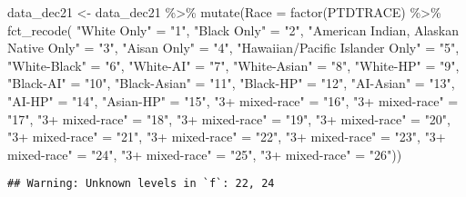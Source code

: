 \documentclass[
]{article}
\newenvironment{Shaded}{\begin{snugshade}}{\end{snugshade}}
\newcommand{\AttributeTok}[1]{\textcolor[rgb]{0.77,0.63,0.00}{#1}}
\newcommand{\FunctionTok}[1]{\textcolor[rgb]{0.00,0.00,0.00}{#1}}
\newcommand{\NormalTok}[1]{#1}
\newcommand{\OtherTok}[1]{\textcolor[rgb]{0.56,0.35,0.01}{#1}}
\newcommand{\SpecialCharTok}[1]{\textcolor[rgb]{0.00,0.00,0.00}{#1}}
\newcommand{\StringTok}[1]{\textcolor[rgb]{0.31,0.60,0.02}{#1}}
\begin{document}
\begin{Shaded}
\begin{Highlighting}[]
\NormalTok{data\_dec21 }\OtherTok{\textless{}{-}}\NormalTok{ data\_dec21 }\SpecialCharTok{\%\textgreater{}\%} 
  \FunctionTok{mutate}\NormalTok{(}\AttributeTok{Race =} \FunctionTok{factor}\NormalTok{(PTDTRACE) }\SpecialCharTok{\%\textgreater{}\%} 
    \FunctionTok{fct\_recode}\NormalTok{(}
      \StringTok{"White Only"} \OtherTok{=} \StringTok{"1"}\NormalTok{,}
      \StringTok{"Black Only"} \OtherTok{=} \StringTok{"2"}\NormalTok{,}
      \StringTok{"American Indian, Alaskan Native Only"} \OtherTok{=} \StringTok{"3"}\NormalTok{,}
      \StringTok{"Aisan Only"} \OtherTok{=} \StringTok{"4"}\NormalTok{,}
      \StringTok{"Hawaiian/Pacific Islander Only"} \OtherTok{=} \StringTok{"5"}\NormalTok{,}
      \StringTok{"White{-}Black"} \OtherTok{=} \StringTok{"6"}\NormalTok{,}
      \StringTok{"White{-}AI"} \OtherTok{=} \StringTok{"7"}\NormalTok{,}
      \StringTok{"White{-}Asian"} \OtherTok{=} \StringTok{"8"}\NormalTok{, }
      \StringTok{"White{-}HP"} \OtherTok{=} \StringTok{"9"}\NormalTok{,}
      \StringTok{"Black{-}AI"} \OtherTok{=} \StringTok{"10"}\NormalTok{,}
      \StringTok{"Black{-}Asian"} \OtherTok{=} \StringTok{"11"}\NormalTok{,}
      \StringTok{"Black{-}HP"} \OtherTok{=} \StringTok{"12"}\NormalTok{,}
      \StringTok{"AI{-}Asian"} \OtherTok{=} \StringTok{"13"}\NormalTok{,}
      \StringTok{"AI{-}HP"} \OtherTok{=} \StringTok{"14"}\NormalTok{,}
      \StringTok{"Asian{-}HP"} \OtherTok{=} \StringTok{"15"}\NormalTok{,}
      \StringTok{"3+ mixed{-}race"} \OtherTok{=} \StringTok{"16"}\NormalTok{,}
      \StringTok{"3+ mixed{-}race"} \OtherTok{=} \StringTok{"17"}\NormalTok{, }
      \StringTok{"3+ mixed{-}race"} \OtherTok{=} \StringTok{"18"}\NormalTok{, }
      \StringTok{"3+ mixed{-}race"} \OtherTok{=} \StringTok{"19"}\NormalTok{, }
      \StringTok{"3+ mixed{-}race"} \OtherTok{=} \StringTok{"20"}\NormalTok{, }
      \StringTok{"3+ mixed{-}race"} \OtherTok{=} \StringTok{"21"}\NormalTok{, }
      \StringTok{"3+ mixed{-}race"} \OtherTok{=} \StringTok{"22"}\NormalTok{, }
      \StringTok{"3+ mixed{-}race"} \OtherTok{=} \StringTok{"23"}\NormalTok{, }
      \StringTok{"3+ mixed{-}race"} \OtherTok{=} \StringTok{"24"}\NormalTok{, }
      \StringTok{"3+ mixed{-}race"} \OtherTok{=} \StringTok{"25"}\NormalTok{, }
      \StringTok{"3+ mixed{-}race"} \OtherTok{=} \StringTok{"26"}\NormalTok{))}
\end{Highlighting}
\end{Shaded}

\begin{verbatim}
## Warning: Unknown levels in `f`: 22, 24
\end{verbatim}
\end{document}
